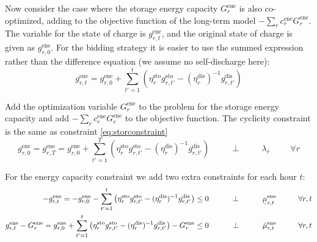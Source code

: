 \documentclass[final,3p,times]{elsarticle}
\newcommand{\ubar}[1]{\text{\b{$#1$}}}
\begin{document}
Now consider the case where the storage energy capacity $G^{\textrm{ene}}_r$ is also co-optimized, adding to the objective function of the long-term model  $-\sum_r c^{\textrm{ene}}_r G^{\textrm{ene}}_r$. The variable for the state of charge is
$g^{\textrm{ene}}_{r,t}$, and the original state of charge is given as $g^{\textrm{ene}}_{r,0}$. For the bidding strategy it is easier to use the summed expression rather than the difference equation (we assume no self-discharge here):
\begin{equation}
  g^{\textrm{ene}}_{r,t} = g^{\textrm{ene}}_{r,0} + \sum_{t'=1}^t \left( \eta^{\textrm{sto}}_r g^{\textrm{sto}}_{r,t'} - (\eta^{\textrm{dis}}_r)^{-1} g^{\textrm{dis}}_{r,t'} \right)
\end{equation}

Add the optimization variable $G^{\textrm{ene}}_r$ to the problem for the storage energy capacity and add $-\sum_r c^{\textrm{ene}}_r G^{\textrm{ene}}_r$ to the objective function.
The cyclicity constraint is the same as constraint \eqref{eq:storconstraint}
\begin{equation}
 g^{\textrm{ene}}_{r,0} = g^{\textrm{ene}}_{r,T} = g^{\textrm{ene}}_{r,0} + \sum_{t'=1}^T \left( \eta^{\textrm{sto}}_r g^{\textrm{sto}}_{r,t'} - (\eta^{\textrm{dis}}_r)^{-1} g^{\textrm{dis}}_{r,t'} \right)   \hspace{1cm}\perp \hspace{1cm} \lambda_{r} \hspace{1cm} \forall r
\end{equation}

For the energy capacity constraint  we add two extra constraints for each hour $t$:
\begin{align}
-g^{\textrm{ene}}_{r,t} =   -g^{\textrm{ene}}_{r,0} - \sum_{t'=1}^t \left( \eta^{\textrm{sto}}_r g^{\textrm{sto}}_{r,t'} - (\eta^{\textrm{dis}}_r)^{-1} g^{\textrm{dis}}_{r,t'} \right) \leq  0  \hspace{1cm}\perp \hspace{1cm} \ubar{\mu}^{\textrm{ene}}_{r,t} \hspace{1cm} \forall r,t \label{eq:enelower} \\
 g^{\textrm{ene}}_{r,t} - G^{\textrm{ene}}_r = g^{\textrm{ene}}_{r,0} + \sum_{t'=1}^t \left( \eta^{\textrm{sto}}_r g^{\textrm{sto}}_{r,t'} - (\eta^{\textrm{dis}}_r)^{-1} g^{\textrm{dis}}_{r,t'} \right) - G^{\textrm{ene}}_r \leq  0  \hspace{1cm}\perp \hspace{1cm} \bar{\mu}^{\textrm{ene}}_{r,t} \hspace{1cm} \forall r,t \label{eq:eneupper}
\end{align}
\end{document}
